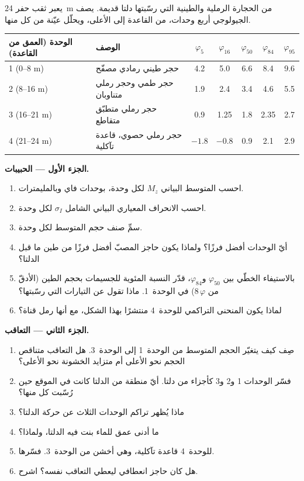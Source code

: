 \begin{problem}
\label{pb:b1:clastic-sediments:1}
يعبر ثقب حفر \qty{24}{m} من الحجارة الرملية والطينية التي رسّبتها دلتا قديمة. يصف الجيولوجي أربع وحدات، من القاعدة إلى الأعلى، ويحلّل عيّنة من كل منها.

\smallskip
\begin{center}\small
\begin{tabular}{@{}llccccc@{}}
\hline
الوحدة (العمق من القاعدة) & الوصف & $\varphi_5$ & $\varphi_{16}$ & $\varphi_{50}$ & $\varphi_{84}$ & $\varphi_{95}$ \\
\hline
1 (0--8 m) & حجر طيني رمادي مصفّح & 4.2 & 5.0 & 6.6 & 8.4 & 9.6 \\
2 (8--16 m) & حجر طمي وحجر رملي متناوبان & 1.9 & 2.4 & 3.4 & 4.6 & 5.5 \\
3 (16--21 m) & حجر رملي متطبّق متقاطع & 0.9 & 1.25 & 1.8 & 2.35 & 2.7 \\
4 (21--24 m) & حجر رملي حصوي، قاعدة تآكلية & $-1.8$ & $-0.8$ & 0.9 & 2.1 & 2.9 \\
\hline
\end{tabular}
\end{center}

\medskip
\noindent\textbf{الجزء الأول --- الحبيبات.}
\begin{enumerate}
  \item احسب المتوسط البياني $M_z$ لكل وحدة، بوحدات فاي وبالمليمترات.
  \item احسب الانحراف المعياري البياني الشامل $\sigma_I$ لكل وحدة.
  \item سمِّ صنف حجم المتوسط  لكل وحدة.
  \item أيّ الوحدات أفضل فرزًا؟ ولماذا يكون حاجز المصبّ أفضل فرزًا من طين ما قبل الدلتا؟
  \item بالاستيفاء الخطّي بين $\varphi_{50}$ و$\varphi_{84}$، قدّر النسبة المئوية للجسيمات بحجم الطين (الأدقّ من $8\,\varphi$) في الوحدة~1. ماذا تقول عن التيارات التي رسّبتها؟
  \item لماذا يكون المنحنى التراكمي للوحدة~4 منتشرًا بهذا الشكل، مع أنها رمل قناة؟
\end{enumerate}

\medskip
\noindent\textbf{الجزء الثاني --- التعاقب.}
\begin{enumerate}[resume]
  \item صِف كيف يتغيّر الحجم المتوسط من الوحدة~1 إلى الوحدة~3. هل التعاقب متناقص الحجم نحو الأعلى أم متزايد الخشونة نحو الأعلى؟
  \item فسّر الوحدات 1 و\num{2} و\num{3} كأجزاء من دلتا. أيّ منطقة من الدلتا كانت في الموقع حين رُسّبت كل منها؟
  \item ماذا يُظهر تراكم الوحدات الثلاث عن حركة الدلتا؟
  \item ما أدنى عمق للماء بنت فيه الدلتا، ولماذا؟
  \item للوحدة~4 قاعدة تآكلية، وهي أخشن من الوحدة~3. فسّرها.
  \item هل كان حاجز انعطافي ليعطي التعاقب نفسه؟ اشرح.
\end{enumerate}


\end{problem}
